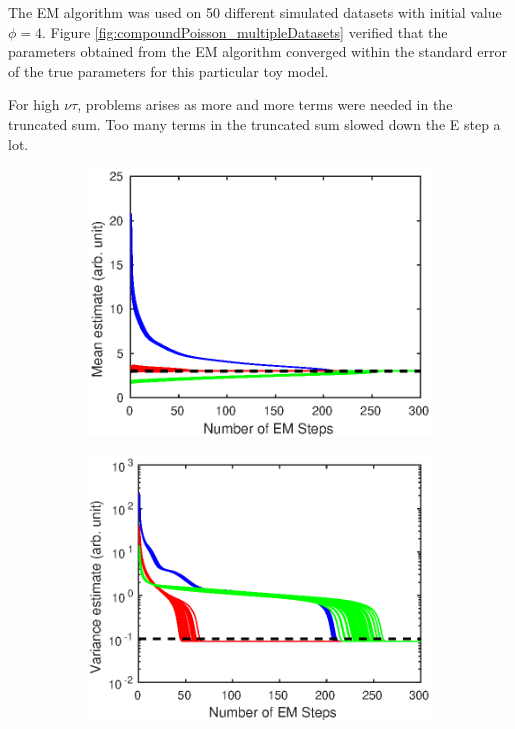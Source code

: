 \documentclass[12pt]{report}
\begin{document}
The EM algorithm was used on 50 different simulated datasets with initial value $\phi=4$. Figure \ref{fig:compoundPoisson_multipleDatasets} verified that the parameters obtained from the EM algorithm converged within the standard error of the true parameters for this particular toy model.

For high $\nu\tau$, problems arises as more and more terms were needed in the truncated sum. Too many terms in the truncated sum slowed down the E step a lot.

\begin{figure}
	\centering
	\begin{subfigure}{0.45\textwidth}
		\includegraphics[width=\textwidth]{figures/hierarchicalModel/EM_initial_mean.eps}
	\end{subfigure}
	\begin{subfigure}{0.45\textwidth}
		\includegraphics[width=\textwidth]{figures/hierarchicalModel/EM_initial_var.eps}

\end{subfigure}
\end{figure}
\end{document}
